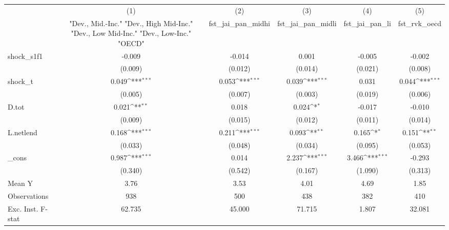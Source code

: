 {
\def\sym#1{\ifmmode^{#1}\else\(^{#1}\)\fi}
\begin{tabular}{l*{5}{c}}
\toprule
            &\multicolumn{1}{c}{(1)}&\multicolumn{1}{c}{(2)}&\multicolumn{1}{c}{(3)}&\multicolumn{1}{c}{(4)}&\multicolumn{1}{c}{(5)}\\
            &\multicolumn{1}{c}{ "Dev., Mid.-Inc." "Dev., High Mid-Inc." "Dev., Low Mid-Inc." "Dev., Low-Inc." "OECD" }&\multicolumn{1}{c}{fst\_jai\_pan\_midhi}&\multicolumn{1}{c}{fst\_jai\_pan\_midli}&\multicolumn{1}{c}{fst\_jai\_pan\_li}&\multicolumn{1}{c}{fst\_rvk\_oecd}\\
\midrule
shock\_s1f1  &      -0.009         &      -0.014         &       0.001         &      -0.005         &      -0.002         \\
            &     (0.009)         &     (0.012)         &     (0.014)         &     (0.021)         &     (0.008)         \\
\addlinespace
shock\_t     &       0.049\sym{***}&       0.053\sym{***}&       0.039\sym{***}&       0.031         &       0.044\sym{***}\\
            &     (0.005)         &     (0.007)         &     (0.003)         &     (0.019)         &     (0.006)         \\
\addlinespace
D.tot       &       0.021\sym{**} &       0.018         &       0.024\sym{*}  &      -0.017         &      -0.010         \\
            &     (0.009)         &     (0.015)         &     (0.012)         &     (0.011)         &     (0.014)         \\
\addlinespace
L.netlend   &       0.168\sym{***}&       0.211\sym{***}&       0.093\sym{**} &       0.165\sym{*}  &       0.151\sym{**} \\
            &     (0.033)         &     (0.048)         &     (0.034)         &     (0.095)         &     (0.053)         \\
\addlinespace
\_cons      &       0.987\sym{***}&       0.014         &       2.237\sym{***}&       3.466\sym{***}&      -0.293         \\
            &     (0.340)         &     (0.542)         &     (0.167)         &     (1.090)         &     (0.313)         \\
\midrule
Mean Y      &        3.76         &        3.53         &        4.01         &        4.69         &        1.85         \\
Observations&         938         &         500         &         438         &         382         &         410         \\
Exc. Inst. F-stat&      62.735         &      45.000         &      71.715         &       1.807         &      32.081         \\
\bottomrule
\end{tabular}
}
